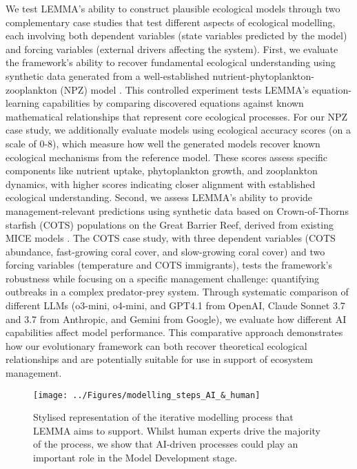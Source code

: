 We test LEMMA's ability to construct plausible ecological models through two complementary case studies that test different aspects of ecological modelling, each involving both dependent variables (state variables predicted by the model) and forcing variables (external drivers affecting the system). First, we evaluate the framework's ability to recover fundamental ecological understanding using synthetic data generated from a well-established nutrient-phytoplankton-zooplankton (NPZ) model \citep{edwards1999zooplankton}.  This controlled experiment tests LEMMA's equation-learning capabilities by comparing discovered equations against known mathematical relationships that represent core ecological processes. For our NPZ case study, we additionally evaluate models using ecological accuracy scores (on a scale of 0-8), which measure how well the generated models recover known ecological mechanisms from the reference model. These scores assess specific components like nutrient uptake, phytoplankton growth, and zooplankton dynamics, with higher scores indicating closer alignment with established ecological understanding. Second, we assess LEMMA's ability to provide management-relevant predictions using synthetic data based on Crown-of-Thorns starfish (COTS) populations on the Great Barrier Reef, derived from existing MICE models \citep{Morello_Plaganyi_Babcock_Sweatman_Hillary_Punt_2014, Rogers_Plaganyi_2022,Plaganyi_Punt_Hillary_Morello_Thebaud_Hutton_Pillans_Thorson_Fulton_Smith_et_al_2014, Condie_Anthony_Babcock_Baird_Beeden_Fletcher_Gorton_Harrison_Hobday_Plaganyi_et_al_2021}. The COTS case study, with three dependent variables (COTS abundance, fast-growing coral cover, and slow-growing coral cover) and two forcing variables (temperature and COTS immigrants), tests the framework's robustness while focusing on a specific management challenge: quantifying outbreaks in a complex predator-prey system. Through systematic comparison of different LLMs (o3-mini, o4-mini, and GPT4.1 from OpenAI, Claude Sonnet 3.7 and 3.7 from Anthropic, and Gemini from Google), we evaluate how different AI capabilities affect model performance. This comparative approach demonstrates how our evolutionary framework can both recover theoretical ecological relationships and are potentially suitable for use in support of ecosystem management.

\begin{figure}[H]
    \centering
    \texttt{[image: ../Figures/modelling\_steps\_AI\_\&\_human]}
    \caption{Stylised representation of the iterative modelling process that LEMMA aims to support. Whilst human experts drive the majority of the process, we show that AI-driven processes could play an important role in the Model Development stage.}
    \label{fig:modelling_intro}
    \end{figure}